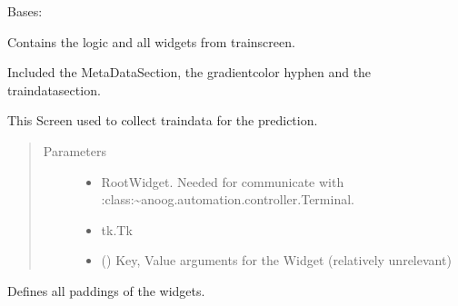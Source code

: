 \documentclass[letterpaper,10pt,english]{sphinxmanual}
\begin{document}
\begin{fulllineitems}
\label{\detokenize{anoog.automation:anoog.automation.graphical_user_interface.Train_Window}}
\sphinxAtStartPar
Bases: {\hyperref[\detokenize{anoog.automation:anoog.automation.graphical_user_interface.Screen}]{}}

\sphinxAtStartPar
Contains the logic and all widgets from train\sphinxhyphen{}screen.

\sphinxAtStartPar
Included the Meta\sphinxhyphen{}Data\sphinxhyphen{}Section, the gradient\sphinxhyphen{}color hyphen and the train\sphinxhyphen{}data\sphinxhyphen{}section.

\sphinxAtStartPar
This Screen used to collect train\sphinxhyphen{}data for the prediction.
\begin{quote}\begin{description}
\item[{Parameters}] \leavevmode\begin{itemize}
\item {} 
\sphinxAtStartPar
{} \textendash{} Root\sphinxhyphen{}Widget. Needed for communicate with :class:\textasciitilde{}anoog.automation.controller.Terminal.

\item {} 
\sphinxAtStartPar
{} \textendash{} tk.Tk

\item {} 
\sphinxAtStartPar
{} () \textendash{} Key, Value arguments for the Widget (relatively unrelevant)

\end{itemize}

\end{description}\end{quote}

\begin{fulllineitems}
\label{\detokenize{anoog.automation:anoog.automation.graphical_user_interface.Train_Window.add_padding}}
\sphinxAtStartPar
Defines all paddings of the widgets.


\end{fulllineitems}
\end{fulllineitems}
\end{document}
